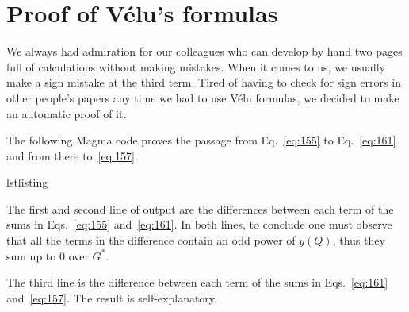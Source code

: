 

\chapter{Proof of Vélu's formulas}
\label{cha:proof-velus-formulas}

  We always had admiration for our
colleagues who can develop by hand two pages full of calculations
without making mistakes. When it comes to us, we usually make a sign
mistake at the third term. Tired of having to check for sign errors in
other people's papers any time we had to use Vélu formulas, we decided
to make an automatic proof of it.

The following Magma code proves the passage from Eq.~\eqref{eq:155} to
Eq.~\eqref{eq:161} and from there to~\eqref{eq:157}.

\begin{xcomment}{lstlisting}

\end{xcomment}

The first and second line of output are the differences between each
term of the sums in Eqs.~\eqref{eq:155} and~\eqref{eq:161}. In both
lines, to conclude one must observe that all the terms in the
difference contain an odd power of $y(Q)$, thus they sum up to $0$
over $G^\ast$.

The third line is the difference between each term of the sums in
Eqs.~\eqref{eq:161} and~\eqref{eq:157}. The result is
self-explanatory.


